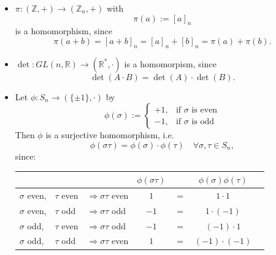 \begin{example}
\begin{itemize}
    \item $\pi : (\mathbb{Z}, +) \to (\mathbb{Z}_n, +)$ with 
    $$\pi(a) := [a]_n$$ 
    is a homomorphism, since
    $$\pi(a+b) = [a+b]_n = [a]_n + [b]_n = \pi(a) + \pi(b).$$
    
    \item $\det : GL(n, \mathbb{R}) \to (\mathbb{R}^*, \cdot)$ is a homomorpism, since
    $$\det(A \cdot B) = \det(A) \cdot \det(B).$$
    
    \item Let $\phi : S_n \to (\{ \pm 1 \}, \cdot)$ by $$\phi(\sigma) := \begin{cases} +1, & \text{if } \sigma \text{ is even} \\ -1, & \text{if } \sigma \text{ is odd} \end{cases}$$
    Then $\phi$ is a surjective homomorphism, i.e.
    $$\phi(\sigma \tau) = \phi(\sigma) \cdot \phi(\tau) \quad \forall \sigma, \tau \in S_n,$$ 
    since: 
    \begin{center}
    \begin{tabular}{l l l c c c c}
    & & & $\phi(\sigma \tau)$ & & $\phi(\sigma) \phi(\tau)$ & \\
    \hline
    $\sigma$ even, & $\tau$ even & $\Rightarrow \sigma \tau$ even & $1$ & $=$ & $1 \cdot 1$ & \\
    $\sigma$ even, & $\tau$ odd & $\Rightarrow \sigma \tau$ odd & $-1$ & $=$ & $1 \cdot (-1)$ & \\
    $\sigma$ odd, & $\tau$ even & $\Rightarrow \sigma \tau$ odd & $-1$ & $=$ & $(-1) \cdot 1$ & \\
    $\sigma$ odd, & $\tau$ odd & $\Rightarrow \sigma \tau$ even & $1$ & $=$ & $(-1) \cdot (-1)$ & \\
    \end{tabular}
    \end{center}
\end{itemize}
\end{example}

